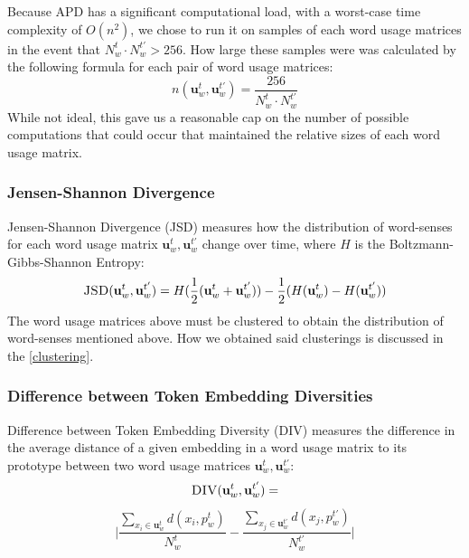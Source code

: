 \documentclass[10pt, a4paper]{article}
\begin{document}
Because APD has a significant computational load, with a worst-case time complexity of $O(n^2)$, we chose to run it on samples of each word usage matrices in the event that $N^{t}_w \cdot N^{t'}_w > 256$. How large these samples were was calculated by the following formula for each pair of word usage matrices:
$$n(\textbf{u}^{t}_w, \textbf{u}^{t'}_w) = \frac{256}{N^{t}_w \cdot N^{t'}_w}$$
While not ideal, this gave us a reasonable cap on the number of possible computations that could occur that maintained the relative sizes of each word usage matrix. %

\subsubsection{Jensen-Shannon Divergence}
\label{JSD}
Jensen-Shannon Divergence (JSD) measures how the distribution of word-senses for each word usage matrix $\textbf{u}^{t}_w, \textbf{u}^{t'}_w$ change over time, where $H$ is the Boltzmann-Gibbs-Shannon Entropy:
\small $$\textsc{JSD}(\textbf{u}^{t}_w, \textbf{u}^{t'}_w) = H(\frac{1}{2}(\textbf{u}^{t}_w + \textbf{u}^{t'}_w)) - \frac{1}{2}(H(\textbf{u}^{t}_w) - H(\textbf{u}^{t'}_w))$$
The word usage matrices above must be clustered to obtain the distribution of word-senses mentioned above. How we obtained said clusterings is discussed in the \ref{clustering}.
\subsubsection{Difference between Token Embedding Diversities}
Difference between Token Embedding Diversity (DIV) measures the difference in the average distance of a given embedding in a word usage matrix to its prototype between two word usage matrices $\textbf{u}^{t}_w, \textbf{u}^{t'}_w$:
$$\textsc{DIV}(\textbf{u}^{t}_w, \textbf{u}^{t'}_w) = $$ 
$$\Bigg | \frac{\sum_{x_i \in \textbf{u}^{t}_w} d(x_i, p^{t}_w)}{N^{t}_w} - \frac{\sum_{x_j \in \textbf{u}^{t'}_w} d(x_j, p^{t'}_w)}{N^{t'}_w} \Bigg |$$
\end{document}
